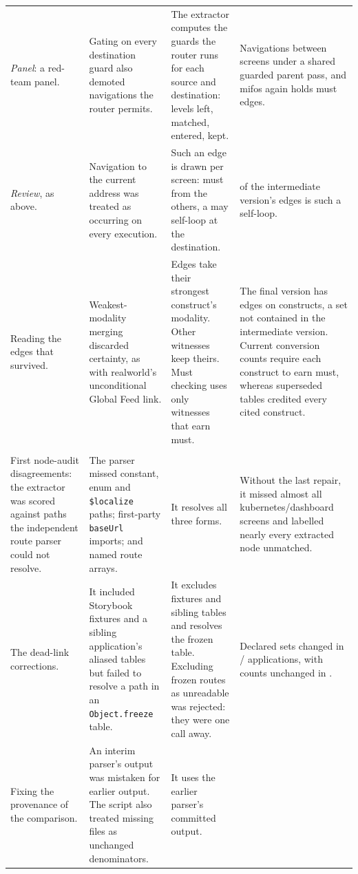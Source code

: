 \begin{xltabular}{\textwidth}{@{}YYYY@{}}
\emph{Panel}: a red-team panel.
  & Gating on every destination guard also demoted navigations the router permits.
  & The extractor computes the guards the router runs for each source and destination: levels left, matched, entered, kept.
  & Navigations between screens under a shared guarded parent pass, and mifos again holds \CensusMustMifos{} must edges. \\
\emph{Review}, as above.
  & Navigation to the current address was treated as occurring on every execution.
  & Such an edge is drawn per screen: must from the others, a may self-loop at the destination.
  & \MustFateSelfLoop{} of the intermediate version's edges is such a self-loop. \\
Reading the edges that survived.
  & Weakest-modality merging discarded certainty, as with realworld's unconditional Global Feed link.
  & Edges take their strongest construct's modality. Other witnesses keep theirs. Must checking uses only witnesses that earn must.
  & The final version has \CensusMust{} edges on \CensusMustSites{} constructs, a set not contained in the intermediate version. Current conversion counts require each construct to earn must, whereas superseded tables credited every cited construct. \\
\addlinespace
{} \\
First node-audit disagreements: the extractor was scored against paths the independent route parser could not resolve.
  & The parser missed constant, enum and \texttt{\$localize} paths; first-party \texttt{baseUrl} imports; and named route arrays.
  & It resolves all three forms.
  & Without the last repair, it missed almost all kubernetes/dashboard screens and labelled nearly every extracted node unmatched. \\
The dead-link corrections.
  & It included Storybook fixtures and a sibling application's aliased tables but failed to resolve a path in an \texttt{Object.freeze} table.
  & It excludes fixtures and sibling tables and resolves the frozen table. Excluding frozen routes as unreadable was rejected: they were one call away.
  & Declared sets changed in \RoundTwoSetMoved{}/\CensusApps{} applications, with counts unchanged in \RoundTwoSetMovedCountSame{}. \\
Fixing the provenance of the comparison.
  & An interim parser's output was mistaken for earlier output. The script also treated missing files as unchanged denominators.
  & It uses the earlier parser's committed output.

\end{xltabular}
